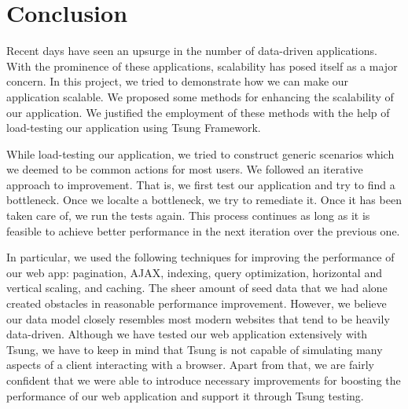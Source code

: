 \chapter{Conclusion}
Recent days have seen an upsurge in the number of data-driven applications. With the prominence of these applications, scalability has posed itself as a major concern. In this project, we tried to demonstrate how we can make our application scalable. We proposed some methods for enhancing the scalability of our application. We justified the employment of these methods with the help of load-testing our application using Tsung Framework.

While load-testing our application, we tried to construct generic scenarios which we deemed to be common actions for most users. We followed an iterative approach to improvement. That is, we first test our application and try to find a bottleneck. Once we localte a bottleneck, we try to remediate it. Once it has been taken care of, we run the tests again. This process continues as long as it is feasible to achieve better performance in the next iteration over the previous one.

In particular, we used the following techniques for improving the performance of our web app: pagination, AJAX, indexing, query optimization, horizontal and vertical scaling, and caching. The sheer amount of seed data that we had alone created obstacles in reasonable performance improvement. However, we believe our data model closely resembles most modern websites that tend to be heavily data-driven. Although we have tested our web application extensively with Tsung, we have to keep in mind that Tsung is not capable of simulating many aspects of a client interacting with a browser. Apart from that, we are fairly confident that we were able to introduce necessary improvements for boosting the performance of our web application and support it through Tsung testing.
